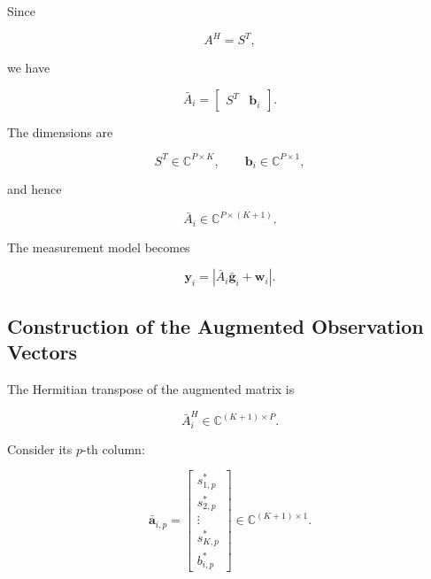 \documentclass[12pt,a4paper]{article}
\begin{document}
Since

\begin{equation}
A^H=S^T,
\tag{248}
\end{equation}

we have

\begin{equation}
\boxed{
\bar A_i
=
\begin{bmatrix}
S^T & \mathbf b_i
\end{bmatrix}
}.
\tag{249}
\end{equation}

The dimensions are

\begin{equation}
S^T\in\mathbb C^{P\times K},
\qquad
\mathbf b_i\in\mathbb C^{P\times1},
\tag{250}
\end{equation}

and hence

\begin{equation}
\boxed{
\bar A_i\in\mathbb C^{P\times(K+1)}
}.
\tag{251}
\end{equation}

The measurement model becomes

\begin{equation}
\boxed{
\mathbf y_i
=
\left|
\bar A_i\bar{\mathbf g}_i+\mathbf w_i
\right|
}.
\tag{252}
\end{equation}

\subsection{Construction of the Augmented Observation Vectors}

The Hermitian transpose of the augmented matrix is

\begin{equation}
\bar A_i^H
\in
\mathbb C^{(K+1)\times P}.
\tag{253}
\end{equation}

Consider its $p$-th column:

\begin{equation}
\boxed{
\bar{\mathbf a}_{i,p}
=
\begin{bmatrix}
s_{1,p}^{*}\\
s_{2,p}^{*}\\
\vdots\\
s_{K,p}^{*}\\
b_{i,p}^{*}
\end{bmatrix}
\in
\mathbb C^{(K+1)\times1}
}.
\tag{254}
\end{equation}
\end{document}
